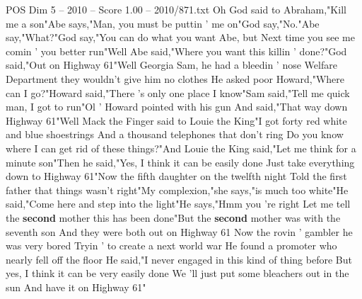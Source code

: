 \begin{textsample}{POS Dim 5 – 2010 – Score 1.00 – 2010/871.txt}  \label{ex:f5_pos_036}
Oh God said to Abraham,"Kill me a son"Abe says,"Man, you must be puttin ' me on"God say,"No."Abe say,"What?"God say,"You can do what you want Abe, but Next time you see me comin ' you better run"Well Abe said,"Where you want this killin ' done?"God said,"Out on Highway 61"Well Georgia Sam, he had a bleedin ' nose Welfare Department they wouldn't give him no clothes He asked poor Howard,"Where can I go?"Howard said,"There 's only one place I know"Sam said,"Tell me quick man, I got to run"Ol ' Howard pointed with his gun And said,"That way down Highway 61"Well Mack the Finger said to Louie the King"I got forty red white and blue shoestrings And a thousand telephones that don't ring Do you know where I can get rid of these things?"And Louie the King said,"Let me think for a minute son"Then he said,"Yes, I think it can be easily done Just take everything down to Highway 61"Now the fifth daughter on the twelfth night Told the first father that things wasn't right"My complexion,"she says,"is much too white"He said,"Come here and step into the light"He says,"Hmm you 're right Let me tell the \textbf{second} mother this has been done"But the \textbf{second} mother was with the seventh son And they were both out on Highway 61 Now the rovin ' gambler he was very bored Tryin ' to create a next world war He found a promoter who nearly fell off the floor He said,"I never engaged in this kind of thing before But yes, I think it can be very easily done We 'll just put some bleachers out in the sun And have it on Highway 61"

\end{textsample}
